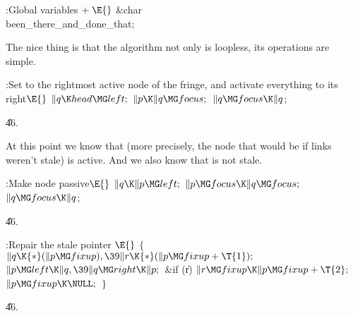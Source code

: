 \B{}:Global variables\X${}\mathrel+\E{}$\6
\&{char} \\{been\_there\_and\_done\_that};\par
\fi

The nice thing is that the algorithm not only is
loopless, its
operations are simple.

\Y\B\4:Set  to the rightmost active node of the fringe, and
activate everything to its right\X${}\E{}$\6
$\|q\K\\{head}\MG\\{left};{}$\6
${}\|p\K\|q\MG\\{focus};{}$\6
${}\|q\MG\\{focus}\K\|q{}$;\par
\U46.\fi

At this point we know that  (more
precisely, the
node that would be  if links weren't stale) is active.
And we also know that  is not stale.

\Y\B\4:Make node  passive\X${}\E{}$\6
$\|q\K\|p\MG\\{left};{}$\6
${}\|p\MG\\{focus}\K\|q\MG\\{focus};{}$\6
${}\|q\MG\\{focus}\K\|q{}$;\par
\U46.\fi

\B{}:Repair the stale pointer %
\X${}\E{}$\6
${}\{{}$\1\6
${}\|q\K{*}(\|p\MG\\{fixup}),\39\|r\K{*}(\|p\MG\\{fixup}+\T{1});{}$\6
${}\|p\MG\\{left}\K\|q,\39\|q\MG\\{right}\K\|p;{}$\6
\&{if} (\|r)\1\5
${}\|r\MG\\{fixup}\K\|p\MG\\{fixup}+\T{2};{}$\2\6
${}\|p\MG\\{fixup}\K\NULL;{}$\6
\4${}\}{}$\2\par
\U46.\fi

